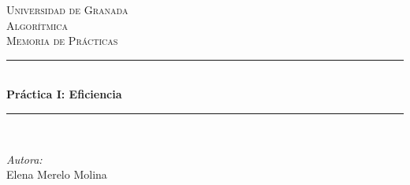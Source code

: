 \begin{titlepage}

\newcommand{\HRule}{\rule{\linewidth}{0.5mm}} %

\center %
 

\textsc{\LARGE Universidad de Granada}\\[1.5cm] %
\textsc{\Large Algorítmica}\\[0.5cm] %
\textsc{\large Memoria de Prácticas}\\[0.5cm] %


\HRule \\[0.4cm]
{ \huge \bfseries Práctica I: Eficiencia}\\[0.4cm] %
\HRule \\[1.5cm]
 

\begin{minipage}{0.4\textwidth}
\begin{flushleft} \large
\emph{Autora:}\\
Elena Merelo Molina \textsc{} %
\end{flushleft}
\end{minipage}
~
\begin{minipage}{0.4\textwidth}
\begin{flushright} \large
\emph{} \\
\textsc{} %
\end{flushright}
\end{minipage}\\[2cm]



\end{titlepage}
